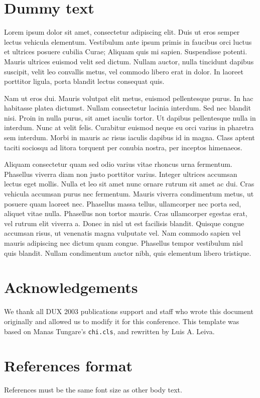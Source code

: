 \documentclass{chi-ext}
\begin{document}
\section{Dummy text}
Lorem ipsum dolor sit amet, consectetur adipiscing elit. Duis ut eros semper lectus vehicula elementum. Vestibulum ante ipsum primis in faucibus orci luctus et ultrices posuere cubilia Curae; Aliquam quis mi sapien. Suspendisse potenti. Mauris ultrices euismod velit sed dictum. Nullam auctor, nulla tincidunt dapibus suscipit, velit leo convallis metus, vel commodo libero erat in dolor. In laoreet porttitor ligula, porta blandit lectus consequat quis.

Nam ut eros dui. Mauris volutpat elit metus, euismod pellentesque purus. In hac habitasse platea dictumst. Nullam consectetur lacinia interdum. Sed nec blandit nisi. Proin in nulla purus, sit amet iaculis tortor. Ut dapibus pellentesque nulla in interdum. Nunc at velit felis. Curabitur euismod neque eu orci varius in pharetra sem interdum. Morbi in mauris ac risus iaculis dapibus id in magna. Class aptent taciti sociosqu ad litora torquent per conubia nostra, per inceptos himenaeos.

Aliquam consectetur quam sed odio varius vitae rhoncus urna fermentum. Phasellus viverra diam non justo porttitor varius. Integer ultrices accumsan lectus eget mollis. Nulla et leo sit amet nunc ornare rutrum sit amet ac dui. Cras vehicula accumsan purus nec fermentum. Mauris viverra condimentum metus, ut posuere quam laoreet nec. Phasellus massa tellus, ullamcorper nec porta sed, aliquet vitae nulla. Phasellus non tortor mauris. Cras ullamcorper egestas erat, vel rutrum elit viverra a. Donec in nisl ut est facilisis blandit. Quisque congue accumsan risus, ut venenatis magna vulputate vel. Nam commodo sapien vel mauris adipiscing nec dictum quam congue. Phasellus tempor vestibulum nisl quis blandit. Nullam condimentum auctor nibh, quis elementum libero tristique.



\section{Acknowledgements}
We thank all DUX 2003 publications support and staff who wrote this document originally and allowed us to modify it for this conference.
This template was based on Manas Tungare's \texttt{chi.cls}, and rewritten by Luis A. Leiva.

\section{References format}
References must be the same font size as other body text.

\balance


\end{document}
